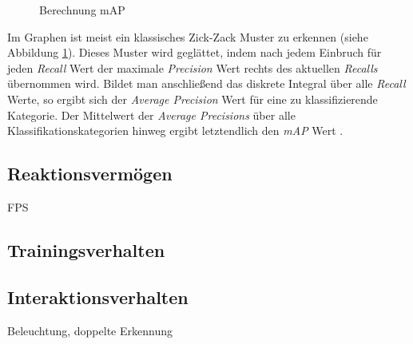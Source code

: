 \begin{figure}[ht]
	\caption[Berechnung mAP]{Berechnung mAP \cite{JonathanHui.20180307}} 
	\label{map}
\end{figure} 

Im Graphen ist meist ein klassisches \glqq Zick-Zack\grqq{} Muster zu erkennen (siehe Abbildung \ref{map}). Dieses Muster wird geglättet, indem nach jedem Einbruch für jeden \textit{Recall} Wert der maximale \textit{Precision} Wert rechts des aktuellen \textit{Recalls} übernommen wird. Bildet man anschließend das diskrete Integral über alle \textit{Recall} Werte, so ergibt sich der \textit{Average Precision} Wert für eine zu klassifizierende Kategorie. Der Mittelwert der  \textit{Average Precisions} über alle Klassifikationskategorien hinweg ergibt letztendlich den \textit{mAP} Wert \cite{JonathanHui.20180307}. 

\subsection*{Reaktionsvermögen}

FPS

\subsection*{Trainingsverhalten}


\subsection*{Interaktionsverhalten}

Beleuchtung, doppelte Erkennung

